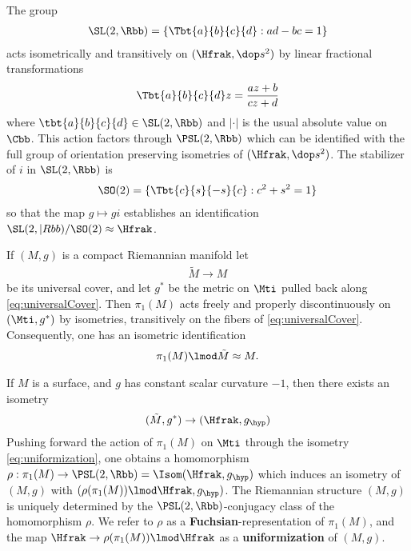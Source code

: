 The group
\begin{align*}
  \SL(2,\Rbb) = \left\{ \Tbt{a}{b}{c}{d}: ad-bc =1 \right\}
\end{align*}
acts isometrically and transitively on $(\Hfrak,\dop s^2)$ by linear fractional transformations
\begin{align*}
  \Tbt{a}{b}{c}{d} z = \frac{az+b}{cz+d} %
\end{align*}
where $\tbt{a}{b}{c}{d} \in \SL(2,\Rbb)$ and $|\cdot|$ is the usual absolute value on $\Cbb$. This action factors through $\PSL(2,\Rbb)$ which can be identified with the full group of orientation preserving isometries of $(\Hfrak,\dop s^2)$. The stabilizer of $i$ in $\SL(2,\Rbb)$ is
\begin{align*}
  \SO(2) = \{\Tbt{c}{s}{-s}{c}: c^2 + s^2 =1\}
\end{align*}
so that the map $g \mapsto g i$ establishes an identification $\SL(2,|Rbb) / \SO(2) \approx \Hfrak$.


If $(M,g)$ is a compact Riemannian manifold let
\begin{align}\label{eq:universalCover}
  \tilde{M} \to M
\end{align}
be its universal cover, and let $g^*$ be the metric on $\Mti$ pulled back along \ref{eq:universalCover}. Then $\pi_1(M)$ acts freely and properly discontinuously on $(\Mti,g^*)$ by isometries, transitively on the fibers of \ref{eq:universalCover}. Consequently, one has an isometric identification
\begin{align}
  \pi_1(M) \lmod \tilde{M} \approx M.
\end{align}

If $M$ is a surface, and $g$ has constant scalar curvature $-1$, then there exists an isometry
\begin{align}\label{eq:uniformization}
  (\tilde{M},g^*) \to (\Hfrak , g_\hyp)
\end{align}
Pushing forward the action of $\pi_1(M)$ on $\Mti$ through the isometry \ref{eq:uniformization}, one obtains a homomorphism $\rho: \pi_1(M) \to \PSL(2,\Rbb) =\Isom(\Hfrak,g_\hyp)$ which induces an isometry of $(M,g)$ with $(\rho(\pi_1(M))\lmod \Hfrak,g_\hyp)$. The Riemannian structure  $(M,g)$ is uniquely determined by the $\PSL(2,\Rbb)$-conjugacy class of the homomorphism $\rho$. We refer to $\rho$ as a \textbf{Fuchsian}-representation of $\pi_1(M)$, and the map $\Hfrak \to \rho(\pi_1(M)) \lmod \Hfrak$ as a \textbf{uniformization} of $(M,g)$.




